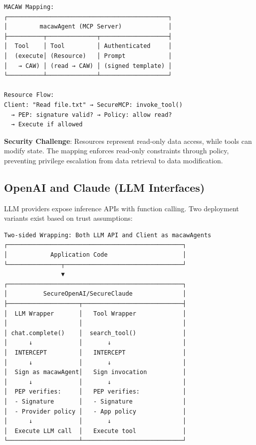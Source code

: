 {{\begin{verbatim}
MACAW Mapping:
┌─────────────────────────────────────────────┐
│         macawAgent (MCP Server)             │
├──────────┬──────────────┬───────────────────┤
│  Tool    │ Tool         │ Authenticated     │
│  (execute│ (Resource)   │ Prompt            │
│   → CAW) │ (read → CAW) │ (signed template) │
└──────────┴──────────────┴───────────────────┘

Resource Flow:
Client: "Read file.txt" → SecureMCP: invoke_tool()
  → PEP: signature valid? → Policy: allow read?
  → Execute if allowed
\end{verbatim}}

\textbf{Security Challenge}: Resources represent read-only data access, while tools can modify state. The mapping enforces read-only constraints through policy, preventing privilege escalation from data retrieval to data modification.

\subsection*{OpenAI and Claude (LLM Interfaces)}

LLM providers expose inference APIs with function calling. Two deployment variants exist based on trust assumptions:

{\tiny
\begin{verbatim}
Two-sided Wrapping: Both LLM API and Client as macawAgents
┌─────────────────────────────────────────────────┐
│            Application Code                     │
└───────────────┬─────────────────────────────────┘
                ▼
┌─────────────────────────────────────────────────┐
│          SecureOpenAI/SecureClaude              │
├────────────────────┬────────────────────────────┤
│  LLM Wrapper       │   Tool Wrapper             │
│                    │                            │
│ chat.complete()    │  search_tool()             │
│      ↓             │       ↓                    │
│  INTERCEPT         │   INTERCEPT                │
│      ↓             │       ↓                    │
│  Sign as macawAgent│   Sign invocation          │
│      ↓             │       ↓                    │
│  PEP verifies:     │   PEP verifies:            │
│  - Signature       │   - Signature              │
│  - Provider policy │   - App policy             │
│      ↓             │       ↓                    │
│  Execute LLM call  │   Execute tool             │
└────────────────────┴────────────────────────────┘


\end{verbatim}}}
